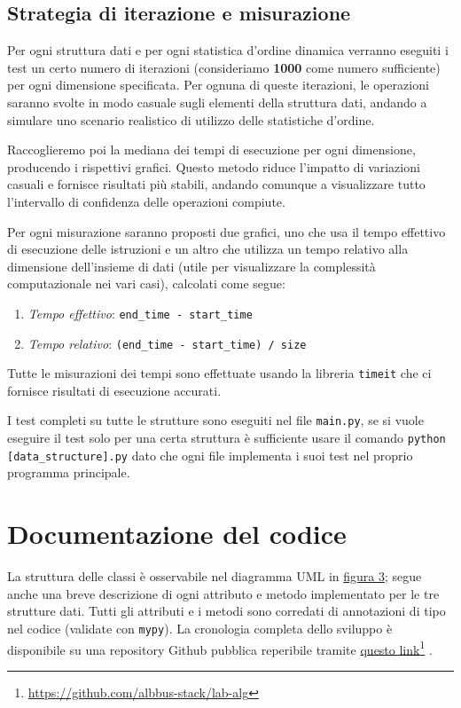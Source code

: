 \documentclass[onecolumn]{article}
\newcommand\anchor[2]{%
  \href{#2}{#1}\footnote{\url{#2}}%
}
\begin{document}
\subsection{Strategia di iterazione e misurazione}

Per ogni struttura dati e per ogni statistica d'ordine dinamica verranno eseguiti i test un certo numero di iterazioni (consideriamo \textbf{1000} come numero sufficiente) per ogni dimensione specificata. Per ognuna di queste iterazioni, le operazioni saranno svolte in modo casuale sugli elementi della struttura dati, andando a simulare uno scenario realistico di utilizzo delle statistiche d'ordine. 

Raccoglieremo poi la mediana dei tempi di esecuzione per ogni dimensione, producendo i rispettivi grafici. Questo metodo riduce l'impatto di variazioni casuali e fornisce risultati più stabili, andando comunque a visualizzare tutto l'intervallo di confidenza delle operazioni compiute.

Per ogni misurazione saranno proposti due grafici, uno che usa il tempo effettivo di esecuzione delle istruzioni e un altro che utilizza un tempo relativo alla dimensione dell'insieme di dati (utile per visualizzare la complessità computazionale nei vari casi), calcolati come segue:
\begin{enumerate}
	\setlength\itemsep{-0.25em}
	\item \textit{Tempo effettivo}: \verb|end_time - start_time|
	\item \textit{Tempo relativo}: \verb|(end_time - start_time) / size|
\end{enumerate}

Tutte le misurazioni dei tempi sono effettuate usando la libreria \verb|timeit| che ci fornisce risultati di esecuzione accurati. 

I test completi su tutte le strutture sono eseguiti nel file \verb|main.py|, se si vuole eseguire il test solo per una certa struttura è sufficiente usare il comando \verb|python [data_structure].py| dato che ogni file implementa i suoi test nel proprio programma principale.

\newpage
\section{Documentazione del codice}

La struttura delle classi è osservabile nel diagramma UML in \hyperref[fig:classi]{figura 3}; segue anche una breve descrizione di ogni attributo e metodo implementato per le tre strutture dati. Tutti gli attributi e i metodi sono corredati di annotazioni di tipo nel codice (validate con \verb|mypy|). La cronologia completa dello sviluppo è disponibile su una repository Github pubblica reperibile tramite \anchor{questo link}{https://github.com/albbus-stack/lab-alg}. 
\end{document}
